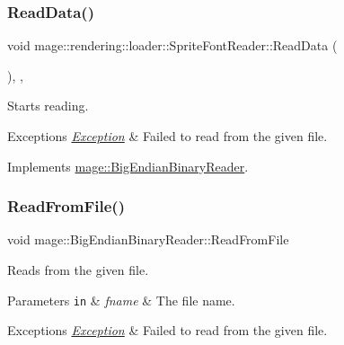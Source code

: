 \subsubsection{\texorpdfstring{Read\+Data()}{ReadData()}}
{\footnotesize\ttfamily void mage\+::rendering\+::loader\+::\+Sprite\+Font\+Reader\+::\+Read\+Data (\begin{DoxyParamCaption}{ }\end{DoxyParamCaption})\hspace{0.3cm}{\ttfamily [override]}, {\ttfamily [private]}, {\ttfamily [virtual]}}

Starts reading.


\begin{DoxyExceptions}{Exceptions}
{\em \mbox{\hyperlink{classmage_1_1_exception}{Exception}}} & Failed to read from the given file. \\
\hline
\end{DoxyExceptions}


Implements \mbox{\hyperlink{classmage_1_1_big_endian_binary_reader_a7dc0689d598fa91308597b129516a11d}{mage\+::\+Big\+Endian\+Binary\+Reader}}.

\mbox{\label{classmage_1_1rendering_1_1loader_1_1_sprite_font_reader_a68db676feaa42c1c3a9bf16d0680b04f}} 
\subsubsection{\texorpdfstring{Read\+From\+File()}{ReadFromFile()}}
{\footnotesize\ttfamily void mage\+::\+Big\+Endian\+Binary\+Reader\+::\+Read\+From\+File}

Reads from the given file.


\begin{DoxyParams}[1]{Parameters}
\mbox{\tt in}  & {\em fname} & The file name. \\
\hline
\end{DoxyParams}

\begin{DoxyExceptions}{Exceptions}
{\em \mbox{\hyperlink{classmage_1_1_exception}{Exception}}} & Failed to read from the given file. \\
\hline
\end{DoxyExceptions}
\mbox{\label{classmage_1_1rendering_1_1loader_1_1_sprite_font_reader_afc48490dca5042078726a1ec3fe7abe7}} 
